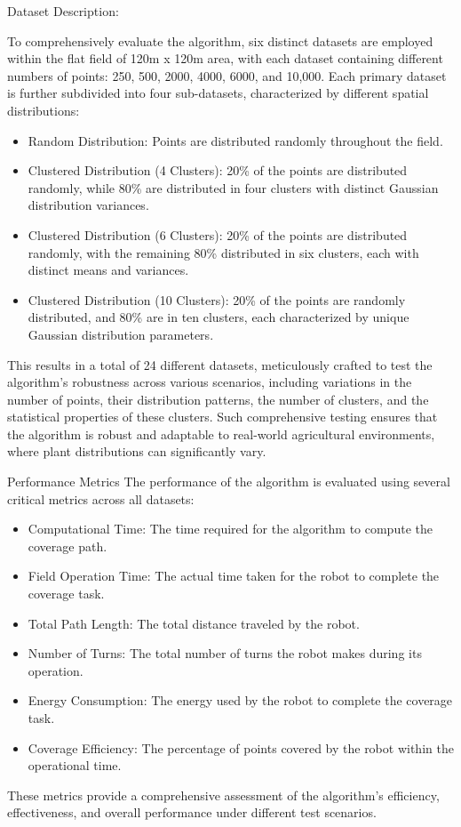 \vspace*{6mm}  

Dataset Description:


To comprehensively evaluate the algorithm, six distinct datasets are employed within the flat field of 120m x 120m area, with each dataset containing different numbers of points: 250, 500, 2000, 4000, 6000, and 10,000. Each primary dataset is further subdivided into four sub-datasets, characterized by different spatial distributions:

\begin{itemize}
    \item Random Distribution: Points are distributed randomly throughout the field.
    \item Clustered Distribution (4 Clusters): 20\% of the points are distributed randomly, while 80\% are distributed in four clusters with distinct Gaussian distribution variances.
    \item Clustered Distribution (6 Clusters): 20\% of the points are distributed randomly, with the remaining 80\% distributed in six clusters, each with distinct means and variances.
    \item Clustered Distribution (10 Clusters): 20\% of the points are randomly distributed, and 80\% are in ten clusters, each characterized by unique Gaussian distribution parameters.
\end{itemize}

This results in a total of 24 different datasets, meticulously crafted to test the algorithm's robustness across various scenarios, including variations in the number of points, their distribution patterns, the number of clusters, and the statistical properties of these clusters. Such comprehensive testing ensures that the algorithm is robust and adaptable to real-world agricultural environments, where plant distributions can significantly vary.

\vspace*{6mm}  

Performance Metrics
The performance of the algorithm is evaluated using several critical metrics across all datasets:

\begin{itemize}
    \item Computational Time: The time required for the algorithm to compute the coverage path.
    \item Field Operation Time: The actual time taken for the robot to complete the coverage task.
    \item Total Path Length: The total distance traveled by the robot.
    \item Number of Turns: The total number of turns the robot makes during its operation.
    \item Energy Consumption: The energy used by the robot to complete the coverage task.
    \item Coverage Efficiency: The percentage of points covered by the robot within the operational time.
\end{itemize}
These metrics provide a comprehensive assessment of the algorithm's efficiency, effectiveness, and overall performance under different test scenarios.

